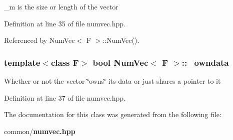 \_\-m is the size or length of the vector 

Definition at line 35 of file numvec.hpp.

Referenced by Num\-Vec$<$ F $>$::Num\-Vec().
\subsubsection{\setlength{\rightskip}{0pt plus 5cm}template$<$class F$>$ bool {\bf Num\-Vec}$<$ F $>$::{\bf \_\-owndata}}\label{classNumVec_4a613b2956a4a0ffff962e497a5d56e0_4a613b2956a4a0ffff962e497a5d56e0}


Whether or not the vector \char`\"{}owns\char`\"{} its data or just shares a pointer to it 

Definition at line 37 of file numvec.hpp.

The documentation for this class was generated from the following file:\begin{CompactItemize}
\item 
common/{\bf numvec.hpp}\end{CompactItemize}
